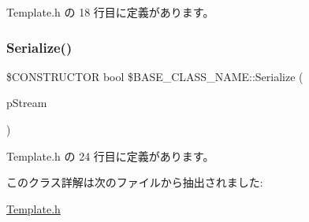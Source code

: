  Template.\+h の 18 行目に定義があります。

\mbox{\label{class_0BBASE__CLASS__NAME_aac20e1257f0f8b1bc98e9a591b8bb224}} 
\subsubsection{\texorpdfstring{Serialize()}{Serialize()}}
{\footnotesize\ttfamily \$C\+O\+N\+S\+T\+R\+U\+C\+T\+OR bool \$B\+A\+S\+E\+\_\+\+C\+L\+A\+S\+S\+\_\+\+N\+A\+M\+E\+::\+Serialize (\begin{DoxyParamCaption}\item[{Memory\+Stream\+Interface $\ast$}]{p\+Stream }\end{DoxyParamCaption})}



 Template.\+h の 24 行目に定義があります。



このクラス詳解は次のファイルから抽出されました\+:\begin{DoxyCompactItemize}
\item 
\mbox{\hyperlink{Template_8h}{Template.\+h}}\end{DoxyCompactItemize}

